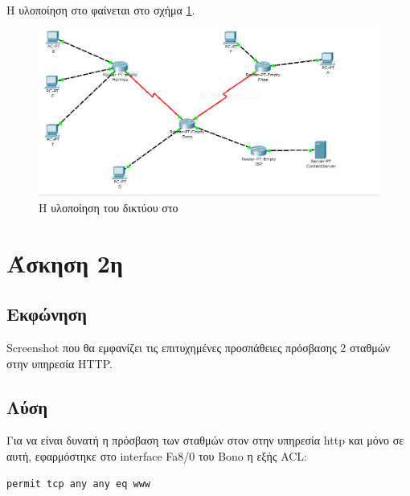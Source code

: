 \documentclass{assignment}
\begin{document}
Η υλοποίηση στο  φαίνεται στο σχήμα \ref{fig:cisco}.

\begin{figure}
\begin{center}
\begin{center}
\includegraphics[width=\textwidth, height=\textheight, keepaspectratio]{images/topology.png}
\end{center}
\caption{Η υλοποίηση του δικτύου στο }
\label{fig:cisco}
\end{center}
\end{figure}

\section{Άσκηση 2η}
\subsection*{Εκφώνηση}
Screenshot που θα εμφανίζει τις επιτυχημένες προσπάθειες πρόσβασης 2 σταθμών στην υπηρεσία HTTP.

\subsection*{Λύση}
Για να είναι δυνατή η πρόσβαση των σταθμών στον στην υπηρεσία http και μόνο σε
αυτή, εφαρμόστηκε στο interface Fa8/0 του Bono η εξής ACL:
\begin{verbatim}
permit tcp any any eq www
\end{verbatim}
\end{document}
